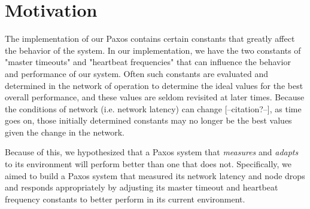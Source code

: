 
\section{Motivation}
The implementation of our Paxos contains certain constants that greatly affect the behavior of the system.  In our implementation, we have the two constants of "master timeouts" and "heartbeat frequencies" that can influence the behavior and performance of our system.  Often such constants are evaluated and determined in the network of operation to determine the ideal values for the best overall performance, and these values are seldom revisited at later times.  Because the conditions of network (i.e. network latency) can change [--citation?--], as time goes on, those initially determined constants may no longer be the best values given the change in the network.

Because of this, we hypothesized that a Paxos system that \textit{measures} and \textit{adapts} to its environment will perform better than one that does not.  Specifically, we aimed to build a Paxos system that measured its network latency and node drops and responds appropriately by adjusting its master timeout and heartbeat frequency constants to better perform in its current environment.  